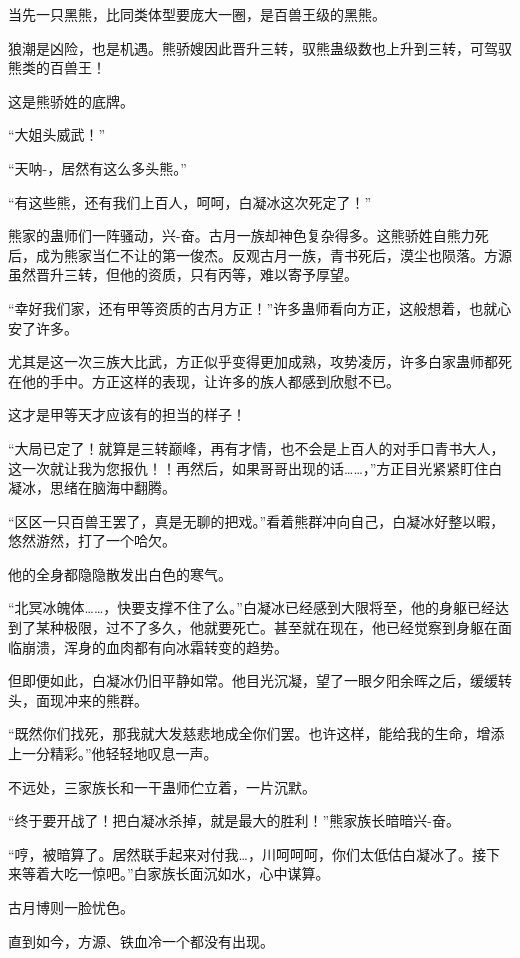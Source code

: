 \begin{this_body}
当先一只黑熊，比同类体型要庞大一圈，是百兽王级的黑熊。

狼潮是凶险，也是机遇。熊骄嫂因此晋升三转，驭熊蛊级数也上升到三转，可驾驭熊类的百兽王！

这是熊骄姓的底牌。

“大姐头威武！”

“天呐-，居然有这么多头熊。”

“有这些熊，还有我们上百人，呵呵，白凝冰这次死定了！”

熊家的蛊师们一阵骚动，兴-奋。古月一族却神色复杂得多。这熊骄姓自熊力死后，成为熊家当仁不让的第一俊杰。反观古月一族，青书死后，漠尘也陨落。方源虽然晋升三转，但他的资质，只有丙等，难以寄予厚望。

“幸好我们家，还有甲等资质的古月方正！”许多蛊师看向方正，这般想着，也就心安了许多。

尤其是这一次三族大比武，方正似乎变得更加成熟，攻势凌厉，许多白家蛊师都死在他的手中。方正这样的表现，让许多的族人都感到欣慰不已。

这才是甲等天才应该有的担当的样子！

“大局已定了！就算是三转巅峰，再有才情，也不会是上百人的对手口青书大人，这一次就让我为您报仇！！再然后，如果哥哥出现的话……，”方正目光紧紧盯住白凝冰，思绪在脑海中翻腾。

“区区一只百兽王罢了，真是无聊的把戏。”看着熊群冲向自己，白凝冰好整以暇，悠然游然，打了一个哈欠。

他的全身都隐隐散发出白色的寒气。

“北冥冰魄体……，快要支撑不住了么。”白凝冰已经感到大限将至，他的身躯已经达到了某种极限，过不了多久，他就要死亡。甚至就在现在，他已经觉察到身躯在面临崩溃，浑身的血肉都有向冰霜转变的趋势。

但即便如此，白凝冰仍旧平静如常。他目光沉凝，望了一眼夕阳余晖之后，缓缓转头，面现冲来的熊群。

“既然你们找死，那我就大发慈悲地成全你们罢。也许这样，能给我的生命，增添上一分精彩。”他轻轻地叹息一声。

不远处，三家族长和一干蛊师伫立着，一片沉默。

“终于要开战了！把白凝冰杀掉，就是最大的胜利！”熊家族长暗暗兴-奋。

“哼，被暗算了。居然联手起来对付我…，川呵呵呵，你们太低估白凝冰了。接下来等着大吃一惊吧。”白家族长面沉如水，心中谋算。

古月博则一脸忧色。

直到如今，方源、铁血冷一个都没有出现。


\end{this_body}
